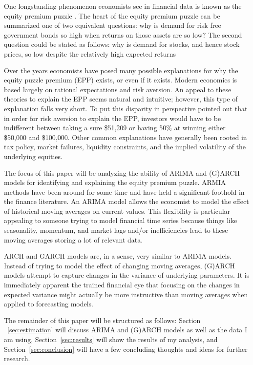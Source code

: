 \documentclass[a4paper, 11pt]{article}
\theoremstyle{definition} %
\numberwithin{equation}{section}
\begin{document}
  One longstanding phenomenon economists see in financial data is known as the equity premium puzzle \citep{Prescott:1985}. The heart of the equity premium puzzle can be summarized one of two equivalent questions: why is demand for risk free government bonds so high when returns on those assets are so low? The second question could be stated as follows:  why is demand for stocks, and hence stock prices, so low despite the relatively high expected returns

  Over the years economists have posed many possible explanations for why the equity puzzle premium (EPP) exists, or even if it exists. Modern economics is based largely on rational expectations and risk aversion. An appeal to these theories to explain the EPP seems natural and intuitive; however, this type of explanation falls very short. To put this disparity in perspective \cite{Mankiw:1991} pointed out that in order for risk aversion to explain the EPP, investors would have to be indifferent between taking a sure \$51,209 or having 50\% at winning either \$50,000 and \$100,000. Other common explanations have generally been rooted in tax policy, market failures, liquidity constraints, and the implied volatility of the underlying equities.

  The focus of this paper will be analyzing the ability of ARIMA and (G)ARCH models for identifying and explaining the equity premium puzzle. ARMIA methods have been around for some time and have held a significant foothold in the finance literature.  An ARIMA model allows the economist to model the effect of historical moving averages on current values. This flexibility is particular appealing to someone trying to model financial time series because things like seasonality, momentum, and market lags and/or inefficiencies lead to these moving averages storing a lot of relevant data.

  ARCH and GARCH models are, in a sense, very similar to ARIMA models. Instead of trying to model the effect of changing moving averages, (G)ARCH models attempt to capture changes in the variance of underlying parameters. It is immediately apparent the trained financial eye that focusing on the changes in expected variance might actually be more instructive than moving averages when applied to forecasting models.

  The remainder of this paper will be structured as follows: Section ~\ref{sec:estimation} will discuss ARIMA and (G)ARCH models as well as the data I am using, Section~\ref{sec:results} will show the results of my analysis, and Section~\ref{sec:conclusion} will have a few concluding thoughts and ideas for further research.
\end{document}

